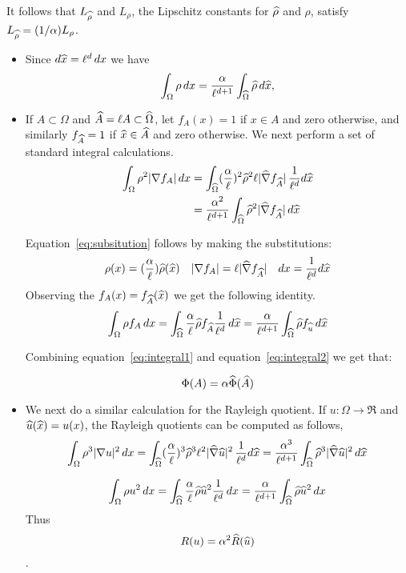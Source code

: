 It follows that $L_{\widehat{\rho}}$ and $L_\rho$, the Lipschitz constants
for $\widehat{\rho}$ and $\rho$,  satisfy $L_{\widehat{\rho}} = (1/\alpha) L_\rho$.

\begin{itemize}
\item
  Since $d\widehat{x} = \ell^{d} \, dx$ we have
  \[
  \int_\Omega \rho \, dx = \frac{\alpha}{\ell^{d+1}} \int_{\widehat{\Omega}} \widehat{\rho} \, d\widehat{x}, 
  \]

\item
  If $A \subset \Omega$ and $\widehat{A} = \ell A \subset \widehat{\Omega}$,
  let $f_A(x) = 1$ if $x \in A$ and zero otherwise, and similarly
  $f_{\widehat{A}} = 1$ if $\widehat{x} \in \widehat{A}$ and zero otherwise. We next perform
  a set of standard integral calculations.
  \begin{align}
  \int_\Omega \rho^2 |\nabla f_A| \, dx &=
  \int_{\widehat{\Omega}} (\frac{\alpha}{\ell})^2 \widehat{\rho}^2 \ell |\widehat{\nabla} f_{\widehat{A}}|
  \, \frac{1}{\ell^d} d\widehat{x} \label{eq:subsitution}\\
  &= \frac{\alpha^2}{\ell^{d+1}} \int_{\widehat{\Omega}} \widehat{\rho}^2  |\widehat{\nabla} f_{\widehat{A}}|
  \, d\widehat{x} \label{eq:integral1}
  \end{align}

  Equation~\ref{eq:subsitution} follows by making the substitutions:
  \[ \rho(x) = (\frac{\alpha}{\ell}) \widehat{\rho}(\widehat{x}) \quad
  |\nabla f_A| = \ell |\widehat{\nabla} f_{\widehat{A}}| \quad
  dx =  \frac{1}{\ell^d} d\widehat{x}
  \]
  Observing the $f_A(x) = f_{\widehat{A}}(\widehat{x})$ we get the following identity.
\begin{equation}\label{eq:integral2}
 \int_\Omega \rho f_A \, dx
 = \int_{\widehat{\Omega}} \frac{\alpha}{\ell}  \widehat{\rho} f_{\widehat{A}} \frac{1}{\ell^d} \, d\widehat{x}
   = \frac{\alpha}{\ell^{d+1}} \int_{\widehat{\Omega}} \widehat{\rho} f_{\widehat{u}} \, d\widehat{x}
\end{equation}

Combining equation~\ref{eq:integral1} and equation~\ref{eq:integral2}
we get that:

\begin{equation}
  \Phi(A) = \alpha \widehat{\Phi}(\widehat{A})
\end{equation}

\item
  We next do a similar calculation for the Rayleigh quotient.
  If $u:\Omega \rightarrow \Re$ and $\widehat{u}(\widehat{x}) = u(x)$, 
  the Rayleigh quotients can be computed as follows,
  \[
  \int_\Omega \rho^3 |\nabla u|^2 \, dx
  = \int_{\widehat{\Omega}} (\frac{\alpha}{\ell})^3 \widehat{\rho}^3
  \ell^2 |\widehat{\nabla} \widehat{u}|^2 \, \frac{1}{\ell^d} d\widehat{x}
    = \frac{\alpha^3}{\ell^{d+1}} \int_{\widehat{\Omega}} \widehat{\rho}^3 |\widehat{\nabla} \widehat{u}|^2 \, d\widehat{x}
 \]

\[
\int_\Omega \rho u^2 \, dx
= \int_{\widehat{\Omega}} \frac{\alpha}{\ell} \widehat{\rho} \widehat{u}^2 \frac{1}{\ell^d} \, dx
= \frac{\alpha}{\ell^{d+1}} \int_{\widehat{\Omega}} \widehat{\rho} \widehat{u}^2 \, dx
\]
Thus \[  R(u)  = \alpha^2 \widehat{R}(\widehat{u}) \].
\end{itemize}

